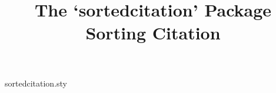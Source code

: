 \begin{filecontents}{sortedcitation.sty}
\newenvironment{sbibliography}{%
\section*{refname}
\parindent=0em}
{%
\ifnum\value{citenum}>0{
\setcounter{tmp}{0}%
	\loop
		\stepcounter{tmp}
		[\csname citeentries\thetmp.seqno\endcsname]\,\csname citeentries\thetmp.ref\endcsname \\
	\ifnum \value{tmp}<\value{citenum} \repeat
	}\fi
\ifnum\value{bibnum}>0{%
\setcounter{tmp}{0}
	\loop
		\stepcounter{tmp}
		[\csname bibentries\thetmp.seqno\endcsname]\,\csname bibentries\thetmp.ref\endcsname \\
	\ifnum \value{tmp}<\value{bibnum} \repeat
	}\fi
}

\end{filecontents}

\documentclass[a4paper]{article}
\usepackage{fontspec}
\setmainfont{Rockwell} %
\usepackage{hyperref}
\usepackage{tikz}
\usetikzlibrary{external}%
\usepackage{fancyvrb-ex}
\usepackage{sortedcitation}

\usepackage{tcolorbox}

\linespread{1.5}
\title{The `sortedcitation' Package \\ Sorting Citation}

\maketitle
Package sortedcitation provides 3 commands to sort the bibliography at the end of the article.

\textbackslash scite\{biblabel\}: similar to \textbackslash cite\{biblabel\}.

\textbackslash sbibitem\{biblabel\}\{the reference content\}: It is DIFFERENT from \\ . For the reference content is served as the second option.

\textbackslash begin{sbibliography}...\textbackslash end\{sbibliography\} has NO option, comparing to \textbackslash begin\{thebibliography\}\{30\}...\textbackslash end\{thebibliography\}.

